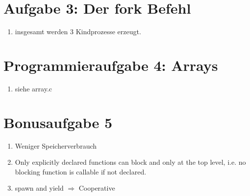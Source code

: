 \documentclass[a4paper,10pt]{article}
\begin{document}
\section*{Aufgabe 3: Der fork Befehl}
\begin{enumerate}
 \item insgesamt werden 3 Kindprozesse erzeugt.
\end{enumerate}

\section*{Programmieraufgabe 4: Arrays}
\begin{enumerate}
 \item siehe array.c
 
\end{enumerate}


\section*{Bonusaufgabe 5}
\begin{enumerate}
 \item Weniger Speicherverbrauch
 \item Only explicitly declared functions can block and only at the top level, i.e. no blocking function is callable if not declared.
 \item spawn and yield $\Rightarrow$ Cooperative
\end{enumerate}
\end{document}
